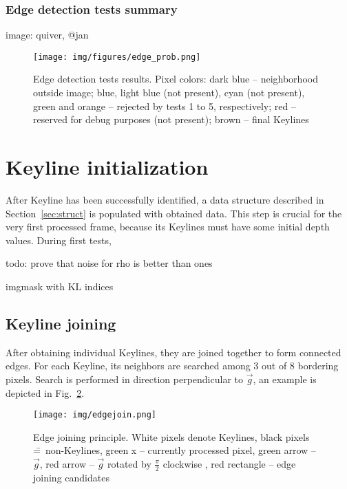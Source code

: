 \subsubsection{Edge detection tests summary}

image: quiver, @jan

\begin{figure}[ht]
	\centering\texttt{[image: img/figures/edge\_prob.png]}
	\caption{ Edge detection tests results. Pixel colors: dark blue -- neighborhood outside image; blue, light blue (not present), cyan (not present), green and orange -- rejected by tests 1 to 5, respectively; red -- reserved for debug purposes (not present); brown -- final Keylines}
	\label{fig:edgeprob}
\end{figure}


\section{Keyline initialization}

After Keyline has been successfully identified, a data structure described in Section~\ref{sec:struct} is populated with obtained data. This step is crucial for the very first processed frame, because its Keylines must have some initial depth values. During first tests, 

todo: prove that noise for rho is better than ones

imgmask with KL indices

\subsection{Keyline joining}

After obtaining individual Keylines, they are joined together to form connected edges.
For each Keyline, its neighbors are searched among 3 out of 8 bordering pixels. Search is performed in direction perpendicular to $\vec{g}$, an example is depicted in Fig.~\ref{fig:edgejoin}.

\begin{figure}[ht]
	\centering\texttt{[image: img/edgejoin.png]}
	\caption{ Edge joining principle. White pixels denote Keylines, black pixels \==~non-Keylines, green x -- currently processed pixel, green arrow -- $\vec{g}$, red arrow -- $\vec{g}$ rotated by $\frac{\pi}{2}$ clockwise , red rectangle -- edge joining candidates }
	\label{fig:edgejoin}
\end{figure}


